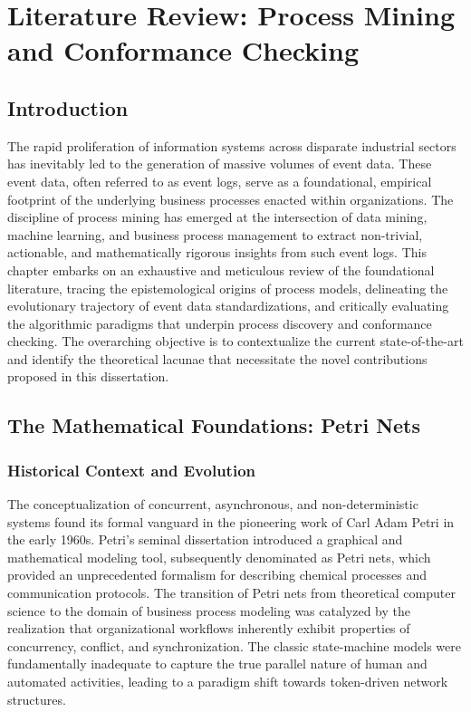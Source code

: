 \chapter{Literature Review: Process Mining and Conformance Checking}
\label{ch:literature_review_pm}

\section{Introduction}
The rapid proliferation of information systems across disparate industrial sectors has inevitably led to the generation of massive volumes of event data. These event data, often referred to as event logs, serve as a foundational, empirical footprint of the underlying business processes enacted within organizations. The discipline of process mining has emerged at the intersection of data mining, machine learning, and business process management to extract non-trivial, actionable, and mathematically rigorous insights from such event logs. This chapter embarks on an exhaustive and meticulous review of the foundational literature, tracing the epistemological origins of process models, delineating the evolutionary trajectory of event data standardizations, and critically evaluating the algorithmic paradigms that underpin process discovery and conformance checking. The overarching objective is to contextualize the current state-of-the-art and identify the theoretical lacunae that necessitate the novel contributions proposed in this dissertation.

\section{The Mathematical Foundations: Petri Nets}
\subsection{Historical Context and Evolution}
The conceptualization of concurrent, asynchronous, and non-deterministic systems found its formal vanguard in the pioneering work of Carl Adam Petri in the early 1960s. Petri's seminal dissertation introduced a graphical and mathematical modeling tool, subsequently denominated as Petri nets, which provided an unprecedented formalism for describing chemical processes and communication protocols. The transition of Petri nets from theoretical computer science to the domain of business process modeling was catalyzed by the realization that organizational workflows inherently exhibit properties of concurrency, conflict, and synchronization. The classic state-machine models were fundamentally inadequate to capture the true parallel nature of human and automated activities, leading to a paradigm shift towards token-driven network structures.

